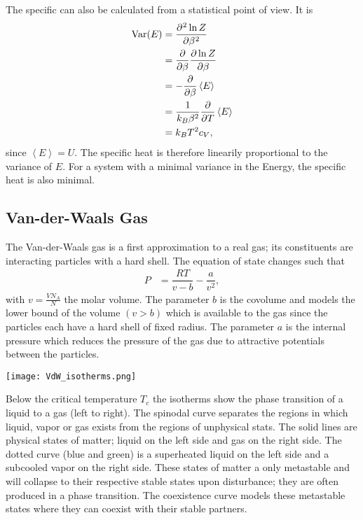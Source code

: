 \documentclass[a4paper,10pt]{article}
\newenvironment{Figure}
  {\par\medskip\noindent\minipage{\linewidth}}
  {\endminipage\par\medskip}%
\numberwithin{equation}{section}
\begin{document}
\begin{multicols}{2}
The specific can also be calculated from a statistical point of view.
It is
\begin{align} 
  \text{Var}(E) &= \diffp[2]{\ln Z}{\beta } \\
                &= \diffp*[]{\diffp[]{\ln Z}{\beta }}{\beta }\\
                &= -\diffp*[]{\left\langle E\right\rangle }{\beta }\\
                &= \dfrac{1}{k_B\beta ^2}\diffp*[]{\left\langle E\right\rangle }{T}\\
                &= k_BT^2c_V
,\end{align} 
since $\left\langle E\right\rangle =U$.
The specific heat is therefore linearily proportional to the variance of $E$.
For a system with a minimal variance in the Energy, the specific heat is also minimal.

\subsection{Van-der-Waals Gas}
The Van-der-Waals gas is a first approximation to a real gas; its constituents are interacting particles with a hard shell.
The equation of state changes such that
\begin{align} 
  P &= \dfrac{RT}{v-b}-\dfrac{a}{v^2}
,\end{align} 
with $v=\tfrac{VN_A}{N}$ the molar volume.
The parameter $b$ is the covolume and models the lower bound of the volume $(v>b)$ which is available to the gas since the particles each have a hard shell of fixed radius.
The parameter $a$ is the internal pressure which reduces the pressure of the gas due to attractive potentials between the particles.
\begin{Figure}
  \centering
  \texttt{[image: VdW\_isotherms.png]}
\end{Figure}
Below the critical temperature $T_c$ the isotherms show the phase transition of a liquid to a gas (left to right).
The spinodal curve separates the regions in which liquid, vapor or gas exists from the regions of unphysical stats.
The solid lines are physical states of matter; liquid on the left side and gas on the right side.
The dotted curve (blue and green) is a superheated liquid on the left side and a subcooled vapor on the right side.
These states of matter a only metastable and will collapse to their respective stable states upon disturbance; they are often produced in a phase transition.
The coexistence curve models these metastable states where they can coexist with their stable partners.


\end{multicols}
\end{document}

